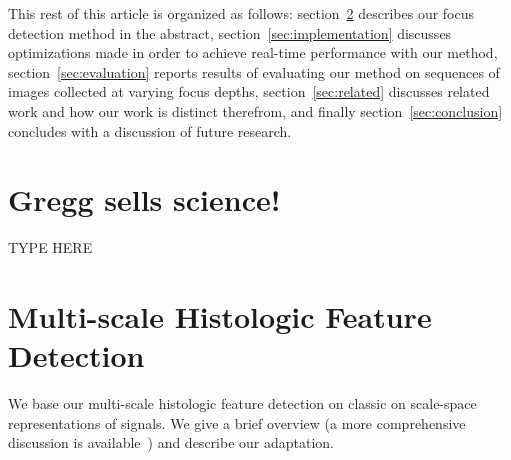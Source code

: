 \documentclass[sigconf,nonacm]{acmart}
\begin{document}
This rest of this article is organized as follows: section~\ref{sec:mhd} describes our focus detection method in the abstract, section~\ref{sec:implementation} discusses optimizations made in order to achieve real-time performance with our method, section~\ref{sec:evaluation} reports results of evaluating our method on sequences of images collected at varying focus depths, section~\ref{sec:related} discusses related work and how our work is distinct therefrom, and finally section~\ref{sec:conclusion} concludes with a discussion of future research.

\section{Gregg sells science!}

TYPE HERE

\section{Multi-scale Histologic Feature Detection}\label{sec:mhd}

We base our multi-scale histologic feature detection on classic on scale-space representations of signals.
We give a brief overview (a more comprehensive discussion is available~\cite{}) and describe our adaptation.
\end{document}
